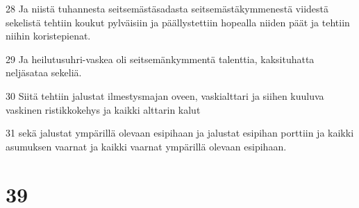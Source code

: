 \par 28 Ja niistä tuhannesta seitsemästäsadasta seitsemästäkymmenestä viidestä sekelistä tehtiin koukut pylväisiin ja päällystettiin hopealla niiden päät ja tehtiin niihin koristepienat.
\par 29 Ja heilutusuhri-vaskea oli seitsemänkymmentä talenttia, kaksituhatta neljäsataa sekeliä.
\par 30 Siitä tehtiin jalustat ilmestysmajan oveen, vaskialttari ja siihen kuuluva vaskinen ristikkokehys ja kaikki alttarin kalut
\par 31 sekä jalustat ympärillä olevaan esipihaan ja jalustat esipihan porttiin ja kaikki asumuksen vaarnat ja kaikki vaarnat ympärillä olevaan esipihaan.

\chapter{39}

